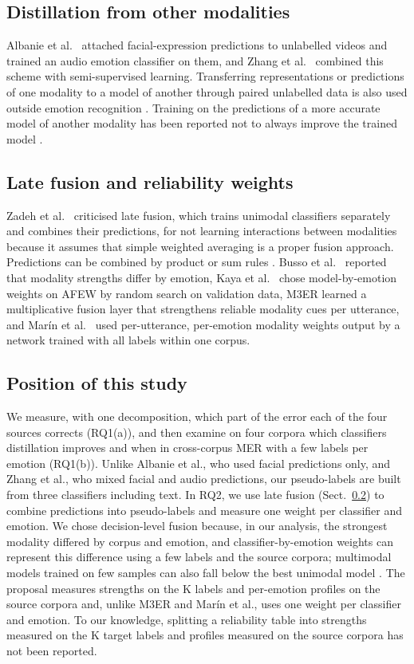 \subsection{Distillation from other modalities}
Albanie et al.\ \cite{albanie2018} attached facial-expression predictions to unlabelled videos and trained an audio emotion classifier on them, and Zhang et al.\ \cite{zhang2021combining} combined this scheme with semi-supervised learning. Transferring representations or predictions of one modality to a model of another through paired unlabelled data is also used outside emotion recognition \cite{gupta2016,jaritz2020xmuda}. Training on the predictions of a more accurate model of another modality has been reported not to always improve the trained model \cite{xue2023mfh}.

\subsection{Late fusion and reliability weights}\label{sec:rel-fusion}
Zadeh et al.\ \cite{zadeh2017tfn} criticised late fusion, which trains unimodal classifiers separately and combines their predictions, for not learning interactions between modalities because it assumes that simple weighted averaging is a proper fusion approach. Predictions can be combined by product or sum rules \cite{kittler1998}. Busso et al.\ \cite{busso2004} reported that modality strengths differ by emotion, Kaya et al.\ \cite{kaya2017} chose model-by-emotion weights on AFEW by random search on validation data, M3ER \cite{mittal2020m3er} learned a multiplicative fusion layer that strengthens reliable modality cues per utterance, and Mar\'in et al.\ \cite{marin2026classwise} used per-utterance, per-emotion modality weights output by a network trained with all labels within one corpus.

\subsection{Position of this study}
We measure, with one decomposition, which part of the error each of the four sources corrects (RQ1(a)), and then examine on four corpora which classifiers distillation improves and when in cross-corpus MER with a few labels per emotion (RQ1(b)). Unlike Albanie et al., who used facial predictions only, and Zhang et al., who mixed facial and audio predictions, our pseudo-labels are built from three classifiers including text. In RQ2, we use late fusion (Sect.~\ref{sec:rel-fusion}) to combine predictions into pseudo-labels and measure one weight per classifier and emotion. We chose decision-level fusion because, in our analysis, the strongest modality differed by corpus and emotion, and classifier-by-emotion weights can represent this difference using a few labels and the source corpora; multimodal models trained on few samples can also fall below the best unimodal model \cite{huang2021}. The proposal measures strengths on the K labels and per-emotion profiles on the source corpora and, unlike M3ER and Mar\'in et al., uses one weight per classifier and emotion. To our knowledge, splitting a reliability table into strengths measured on the K target labels and profiles measured on the source corpora has not been reported.
